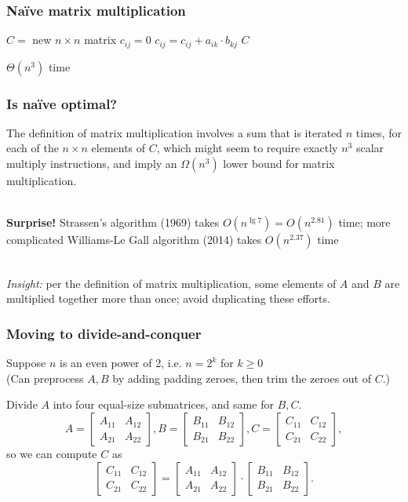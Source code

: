 \documentclass{beamer}
\newcommand{\stanza}{ \\~\ }
\begin{document}
\begin{frame} \frametitle{Na\"ive matrix multiplication}
  {
  \begin{algorithmic}[1]
    \State $C = $ new $n \times n$ matrix
        \State $c_{ij} = 0$
          \State $c_{ij} = c_{ij} + a_{ik} \cdot b_{kj}$
        \EndFor
      \EndFor
    \EndFor
    \State \Return $C$
    \EndFunction
  \end{algorithmic}
  }
  $\Theta(n^3)$ time
\end{frame}

\begin{frame} \frametitle{Is na\"ive optimal?}
The definition of matrix multiplication involves a sum that is iterated $n$
times, for each of the $n \times n$ elements of $C$, which might seem to
require exactly $n^3$ scalar multiply instructions, and imply an
$\Omega(n^3)$ lower bound for matrix multiplication. \stanza

\textbf{Surprise!} Strassen's algorithm (1969) takes $O(n^{\lg 7})=O(n^{2.81})$ time;
 more complicated Williams-Le Gall algorithm (2014) takes $O(n^{2.37})$ time \stanza

\emph{Insight:} per the definition of matrix multiplication, some elements of
$A$ and $B$ are multiplied together more than once; avoid duplicating these
efforts.
\end{frame}

\begin{frame} \frametitle{Moving to divide-and-conquer}
  Suppose $n$ is an even power of 2, i.e. $n=2^k$ for $k \geq 0$ \\
  (Can preprocess $A, B$ by adding padding zeroes, then trim the zeroes
   out of $C.$)

  Divide $A$ into four equal-size submatrices, and same for $B, C$.
  \[ A = \begin{bmatrix} A_{11} & A_{12} \\ A_{21} & A_{22} \end{bmatrix},
     B = \begin{bmatrix} B_{11} & B_{12} \\ B_{21} & B_{22} \end{bmatrix},
     C = \begin{bmatrix} C_{11} & C_{12} \\ C_{21} & C_{22} \end{bmatrix},
   \]
  so we can compute $C$ as
  \[ \begin{bmatrix} C_{11} & C_{12} \\ C_{21} & C_{22} \end{bmatrix}
     =
     \begin{bmatrix} A_{11} & A_{12} \\ A_{21} & A_{22} \end{bmatrix}
     \cdot
     \begin{bmatrix} B_{11} & B_{12} \\ B_{21} & B_{22} \end{bmatrix} . \]
\end{frame}
\end{document}
